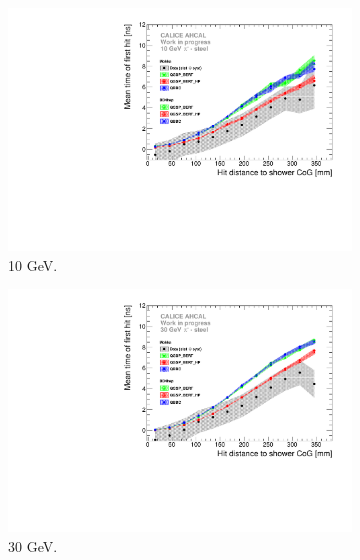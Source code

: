 \begin{figure}[htbp!]
  \begin{subfigure}[t]{0.5\textwidth}
    \centering
    \includegraphics[width=1\textwidth]{../Thesis_Plots/Timing/Pions/Plots/ComparisonToSim/Time_Radius_10GeV_BL.pdf}
    \caption{10 GeV.}\label{fig:Radius_BL_SimData_10GeV}
  \end{subfigure}
  \hfill
  \begin{subfigure}[t]{0.5\textwidth}
    \centering
    \includegraphics[width=1\textwidth]{../Thesis_Plots/Timing/Pions/Plots/ComparisonToSim/Time_Radius_30GeV_BL.pdf}
    \caption{30 GeV.} \label{fig:Radius_BL_SimData_30GeV}
  \end{subfigure}
  \hfill
  \begin{subfigure}[t]{0.5\textwidth}
    \centering

\end{subfigure}
\end{figure}
